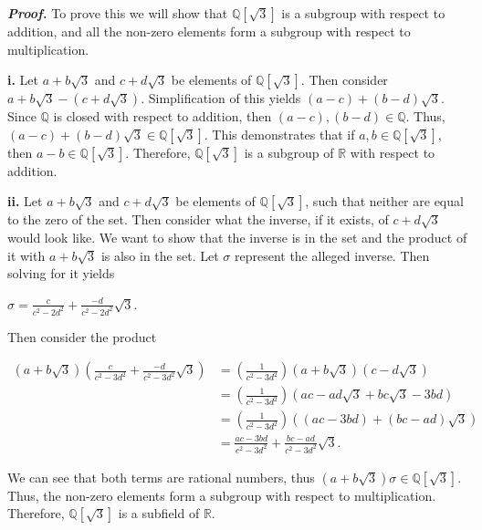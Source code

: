 \documentclass[12pt, a4paper]{article}
\begin{document}
\begin{addmargin}[1.5em]{1.5em}

    \noindent\textbf{\textit{Proof.}} To prove this we will show that $\mathbb{Q}[\sqrt{3}]$ is a subgroup with respect to addition, and all the non-zero elements form a subgroup with respect to multiplication.
    
    \noindent\textbf{i.} Let $a+b\sqrt{3}$ and $c+d\sqrt{3}$ be elements of $\mathbb{Q}[\sqrt{3}]$. Then consider $a+b\sqrt{3}-(c+d\sqrt{3})$. Simplification of this yields $(a-c)+(b-d)\sqrt{3}$. Since $\mathbb{Q}$ is closed with respect to addition, then $(a-c),(b-d)\in\mathbb{Q}$. Thus, $(a-c)+(b-d)\sqrt{3}\in\mathbb{Q}[\sqrt{3}]$. This demonstrates that if $a,b\in\mathbb{Q}[\sqrt{3}]$, then $a-b\in\mathbb{Q}[\sqrt{3}]$. Therefore, $\mathbb{Q}[\sqrt{3}]$ is a subgroup of $\mathbb{R}$ with respect to addition.
    
    \vspace{4mm}
    
    \noindent\textbf{ii.} Let $a+b\sqrt{3}$ and $c+d\sqrt{3}$ be elements of $\mathbb{Q}[\sqrt{3}]$, such that neither are equal to the zero of the set. Then consider what the inverse, if it exists, of $c+d\sqrt{3}$ would look like. We want to show that the inverse is in the set and the product of it with $a+b\sqrt{3}$ is also in the set. Let $\sigma$ represent the alleged inverse. Then solving for it yields
    
    \vspace{4mm}
    
    \centerline{$\sigma=\frac{c}{c^2-2d^2}+\frac{-d}{c^2-2d^2}\sqrt{3}$.}
    
    \vspace{4mm}
    
    \noindent Then consider the product
    
    \begin{equation*}
        \begin{split}
            (a+b\sqrt{3})(\frac{c}{c^2-3d^2}+\frac{-d}{c^2-3d^2}\sqrt{3}) &= (\frac{1}{c^2-3d^2})(a+b\sqrt{3})(c-d\sqrt{3}) \\
            &= (\frac{1}{c^2-3d^2})(ac-ad\sqrt{3}+bc\sqrt{3}-3bd) \\
            &= (\frac{1}{c^2-3d^2})((ac-3bd)+(bc-ad)\sqrt{3}) \\
            &= \frac{ac-3bd}{c^2-3d^2}+\frac{bc-ad}{c^2-3d^2}\sqrt{3}.
        \end{split}
    \end{equation*}
    
    \noindent We can see that both terms are rational numbers, thus $(a+b\sqrt{3})\sigma\in\mathbb{Q}[\sqrt{3}]$. Thus, the non-zero elements form a subgroup with respect to multiplication. Therefore, $\mathbb{Q}[\sqrt{3}]$ is a subfield of $\mathbb{R}$.\hspace{100mm}\square

\end{addmargin}
\end{document}
